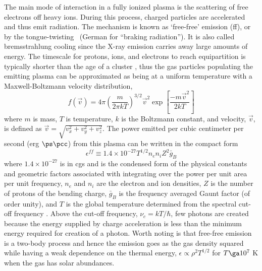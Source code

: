 The main mode of interaction in a fully ionized plasma is the
scattering of free electrons off heavy ions. During this process,
charged particles are accelerated and thus emit radiation. The
mechanism is known as `free-free' emission (ff), or by the
tongue-twisting \tb\ (German for ``braking radiation''). It is also
called bremsstrahlung cooling since the X-ray emission carries away
large amounts of energy. The timescale for protons, ions, and
electrons to reach equipartition is typically shorter than the age of
a cluster \citep{2003PhPl...10.1992S}, thus the gas particles
populating the emitting plasma can be approximated as being at a
uniform temperature with a Maxwell-Boltzmann velocity distribution,
\begin{equation}
f(\vec{v}) = 4 \pi \left(\frac{m}{2 \pi k T}\right)^{3/2} \vec{v}^2
\exp \left[\frac{-m\vec{v}^2}{2k T}\right]
\end{equation}
where $m$ is mass, $T$ is temperature, $k$ is the Boltzmann constant,
and velocity, $\vec{v}$, is defined as $\vec{v} = \sqrt{v_x^2 + v_y^2
  + v_z^2}$. The power emitted per cubic centimeter per second (erg
$\ps \pcc$) from this plasma can be written in the compact form
\begin{equation}
\label{eqn:ff}
\epsilon^{ff} \equiv 1.4\times10^{-27} T^{1/2} n_{e} n_{i} Z^{2} \bar{g}_B
\end{equation}
where $1.4\times10^{-27}$ is in cgs and is the condensed form of the
physical constants and geometric factors associated with integrating
over the power per unit area per unit frequency, $n_e$ and $n_i$ are
the electron and ion densities, $Z$ is the number of protons of the
bending charge, $\bar{g}_B$ is the frequency averaged Gaunt factor (of
order unity), and $T$ is the global temperature determined from the
spectral cut-off frequency \citep{rybicki}. Above the cut-off
frequency, $\nu_c=kT/\hbar$, few photons are created because the
energy supplied by charge acceleration is less than the minimum energy
required for creation of a photon. Worth noting is that free-free
emission is a two-body process and hence the emission goes as the gas
density squared while having a weak dependence on the thermal energy,
$\epsilon \propto \rho^2 T^{1/2}$ for $T \ga 10^7$ K when the gas has
solar abundances.

